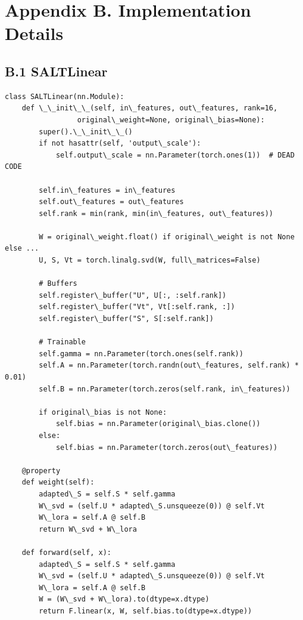
\section{Appendix B. Implementation Details}

\subsection{B.1 SALTLinear}

\begin{lstlisting}
class SALTLinear(nn.Module):
    def \_\_init\_\_(self, in\_features, out\_features, rank=16,
                 original\_weight=None, original\_bias=None):
        super().\_\_init\_\_()
        if not hasattr(self, 'output\_scale'):
            self.output\_scale = nn.Parameter(torch.ones(1))  # DEAD CODE
        
        self.in\_features = in\_features
        self.out\_features = out\_features
        self.rank = min(rank, min(in\_features, out\_features))

        W = original\_weight.float() if original\_weight is not None else ...
        U, S, Vt = torch.linalg.svd(W, full\_matrices=False)
        
        # Buffers
        self.register\_buffer("U", U[:, :self.rank])
        self.register\_buffer("Vt", Vt[:self.rank, :])
        self.register\_buffer("S", S[:self.rank])
        
        # Trainable
        self.gamma = nn.Parameter(torch.ones(self.rank))
        self.A = nn.Parameter(torch.randn(out\_features, self.rank) * 0.01)
        self.B = nn.Parameter(torch.zeros(self.rank, in\_features))
        
        if original\_bias is not None:
            self.bias = nn.Parameter(original\_bias.clone())
        else:
            self.bias = nn.Parameter(torch.zeros(out\_features))
    
    @property
    def weight(self):
        adapted\_S = self.S * self.gamma
        W\_svd = (self.U * adapted\_S.unsqueeze(0)) @ self.Vt
        W\_lora = self.A @ self.B
        return W\_svd + W\_lora
    
    def forward(self, x):
        adapted\_S = self.S * self.gamma
        W\_svd = (self.U * adapted\_S.unsqueeze(0)) @ self.Vt
        W\_lora = self.A @ self.B
        W = (W\_svd + W\_lora).to(dtype=x.dtype)
        return F.linear(x, W, self.bias.to(dtype=x.dtype))
\end{lstlisting}

